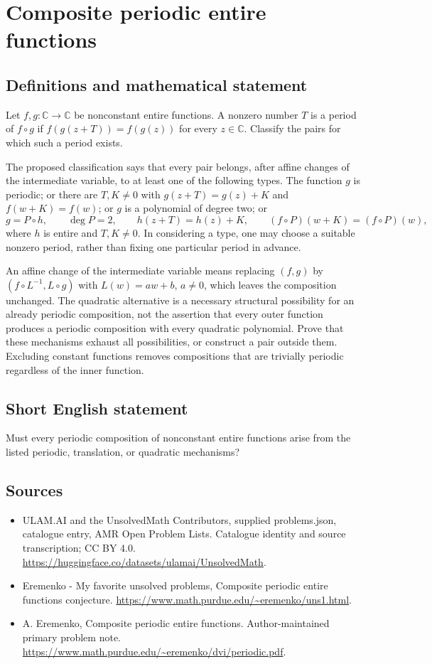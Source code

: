 \documentclass[11pt,a4paper]{article}
\begin{document}
\section*{Composite periodic entire functions}\label{statement}

\subsection{Definitions and mathematical statement}
Let $f,g:\mathbb C\to\mathbb C$ be nonconstant entire
functions. A nonzero number $T$ is a period of $f\circ g$
if $f(g(z+T))=f(g(z))$ for every $z\in\mathbb C$.
Classify the pairs for which such a period exists.

The proposed classification says that every pair belongs,
after affine changes of the intermediate variable, to at
least one of the following types. The function $g$ is
periodic; or there are $T,K\ne0$ with
$g(z+T)=g(z)+K$ and $f(w+K)=f(w)$; or $g$ is a
polynomial of degree two; or
\[
 g=P\circ h,\qquad \deg P=2,\qquad
 h(z+T)=h(z)+K,\qquad
 (f\circ P)(w+K)=(f\circ P)(w),
\]
where $h$ is entire and $T,K\ne0$.
In considering a type, one may choose a suitable nonzero
period, rather than fixing one particular period in advance.

An affine change of the intermediate variable means replacing
$(f,g)$ by $(f\circ L^{-1},L\circ g)$ with
$L(w)=aw+b$, $a\ne0$, which leaves the composition unchanged.
The quadratic alternative is a necessary structural
possibility for an already periodic composition, not the
assertion that every outer function produces a periodic
composition with every quadratic polynomial.
Prove that these mechanisms exhaust all possibilities,
or construct a pair outside them. Excluding constant
functions removes compositions that are trivially periodic
regardless of the inner function.
\subsection{Short English statement}
Must every periodic composition of nonconstant entire functions arise from the listed periodic, translation, or quadratic mechanisms?
\subsection{Sources}
\begin{itemize}
\item[S1] ULAM.AI and the UnsolvedMath Contributors, supplied problems.json, catalogue entry, AMR Open Problem Lists. Catalogue identity and source transcription; CC BY 4.0.
\url{https://huggingface.co/datasets/ulamai/UnsolvedMath}.
\item[S2] Eremenko - My favorite unsolved problems, Composite periodic entire functions conjecture. 
\url{https://www.math.purdue.edu/~eremenko/uns1.html}.
\item[S3] A. Eremenko, Composite periodic entire functions. Author-maintained primary problem note.
\url{https://www.math.purdue.edu/~eremenko/dvi/periodic.pdf}.
\end{itemize}
\end{document}
